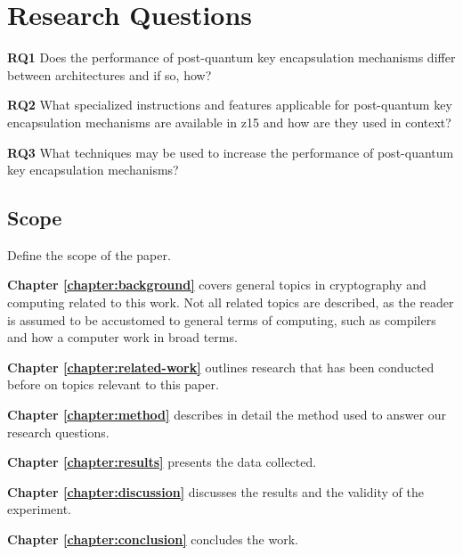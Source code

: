 \section{Research Questions}
\label{section:introduction:research-questions}

\noindent\textbf{RQ1} Does the performance of \gls{post-quantum} key encapsulation mechanisms differ between architectures and if so, how?\label{rq1}\hfill\par
\noindent\textbf{RQ2} What specialized instructions and features applicable for \gls{post-quantum} key encapsulation mechanisms are available in \gls{z15} and how are they used in context?\label{rq2}\hfill\par
\noindent\textbf{RQ3} What techniques may be used to increase the performance of \gls{post-quantum} key encapsulation mechanisms?\label{rq3}\hfill\par

\subsection{Scope}

Define the scope of the paper.



\noindent\textbf{Chapter \ref{chapter:background}} covers general topics in cryptography and computing related to this work. Not all related topics are described, as the reader is assumed to be accustomed to general terms of computing, such as compilers and how a computer work in broad terms.

\noindent\textbf{Chapter \ref{chapter:related-work}} outlines research that has been conducted before on topics relevant to this paper.

\noindent\textbf{Chapter \ref{chapter:method}} describes in detail the method used to answer our research questions.

\noindent\textbf{Chapter \ref{chapter:results}} presents the data collected.

\noindent\textbf{Chapter \ref{chapter:discussion}} discusses the results and the validity of the experiment.

\noindent\textbf{Chapter \ref{chapter:conclusion}} concludes the work.